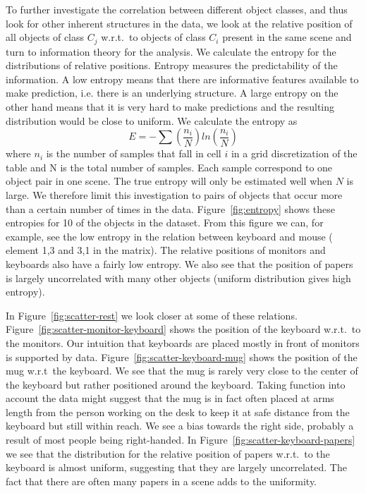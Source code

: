 \documentclass[letterpaper, 10 pt, conference]{ieeeconf}  %
\begin{document}
To further investigate the correlation between different object classes, and thus look for other inherent structures in the data, we look at 
the relative position of all objects of class $C_j$ w.r.t.\ to objects of class $C_i$ present in the same scene and turn to information theory for the analysis. We calculate the entropy for the distributions of relative positions. Entropy measures the predictability of the information. A low entropy means that there are informative features available to make prediction, i.e. there is an underlying structure. A large entropy on the other hand means that it is very hard to make predictions and the resulting distribution would be close to uniform.
We calculate the entropy as 
\begin{equation}
E=-\sum (\frac{n_i}{N})ln(\frac{n_i}{N})
\end{equation}
where $n_i$ is the number of samples that fall in cell $i$ in a grid discretization of the table and N is the total number of samples. Each 
sample correspond to one object pair in one scene. The true entropy will only be estimated well when $N$ is large. We therefore limit this 
investigation to pairs of objects that occur more than a certain number of times in the data. Figure~\ref{fig:entropy} shows these entropies 
for 10 of the objects in the dataset. From this figure we can, for example, see the low entropy in the relation between keyboard and mouse (
element 1,3 and 3,1 in the matrix). The relative positions of monitors and keyboards also have a fairly low entropy. We also see that the 
position of papers is largely uncorrelated with many other objects (uniform distribution gives high entropy). 

In Figure~\ref{fig:scatter-rest} we look closer at some of these relations. Figure~\ref{fig:scatter-monitor-keyboard} shows the position of 
the keyboard w.r.t.\ to the monitors. Our intuition that keyboards are placed mostly in front of monitors is supported by data. 
Figure~\ref{fig:scatter-keyboard-mug} shows the position of the mug w.r.t\ the keyboard. We see that the mug is rarely very close to the center of the 
keyboard but rather positioned around the keyboard. Taking function into account the data might suggest that the mug 
is in fact often placed at arms length from the person working on the desk to keep it at safe distance from the keyboard but still within 
reach. We see a bias towards the right side, probably a result of most people being right-handed. In Figure~\ref{fig:scatter-keyboard-papers} we see 
that the distribution for the relative position of papers w.r.t.\ to the keyboard is almost uniform, suggesting that they are largely uncorrelated. The fact that there are often many papers in a scene adds to the uniformity.
\end{document}
